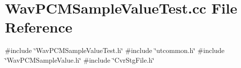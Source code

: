 \section{Wav\+P\+C\+M\+Sample\+Value\+Test.\+cc File Reference}
\label{WavPCMSampleValueTest_8cc}
{\ttfamily \#include \char`\"{}Wav\+P\+C\+M\+Sample\+Value\+Test.\+h\char`\"{}}\newline
{\ttfamily \#include \char`\"{}utcommon.\+h\char`\"{}}\newline
{\ttfamily \#include \char`\"{}Wav\+P\+C\+M\+Sample\+Value.\+h\char`\"{}}\newline
{\ttfamily \#include \char`\"{}Cvr\+Stg\+File.\+h\char`\"{}}\newline
